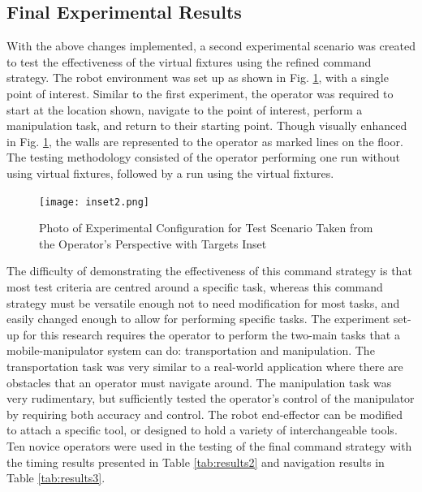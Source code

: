 \documentclass[onecolumn,10pt,final]{asme2ej}
\begin{document}
\subsection{Final Experimental Results}

With the above changes implemented, a second experimental scenario was created to test the effectiveness of the virtual fixtures using the refined command strategy. The robot environment was set up as shown in Fig. \ref{fig:setup}, with a single point of interest. Similar to the first experiment, the operator was required to start at the location shown, navigate to the point of interest, perform a manipulation task, and return to their starting point. Though visually enhanced in Fig. \ref{fig:setup}, the walls are represented to the operator as marked lines on the floor. The testing methodology consisted of the operator performing one run without using virtual fixtures, followed by a run using the virtual fixtures.\\

\begin{figure}[htbp!]
    \centering
    \texttt{[image: inset2.png]}
    \caption{Photo of Experimental Configuration for Test Scenario Taken from the Operator's Perspective with Targets Inset}
    \label{fig:setup}
\end{figure} 

The difficulty of demonstrating the effectiveness of this command strategy is that most test criteria are centred around a specific task, whereas this command strategy must be versatile enough not to need modification for most tasks, and easily changed enough to allow for performing specific tasks. The experiment set-up for this research requires the operator to perform the two-main tasks that a mobile-manipulator system can do: transportation and manipulation. The transportation task was very similar to a real-world application where there are obstacles that an operator must navigate around. The manipulation task was very rudimentary, but sufficiently tested the operator's control of the manipulator by requiring both accuracy and control. The robot end-effector can be modified to attach a specific tool, or designed to hold a variety of interchangeable tools. Ten novice operators were used in the testing of the final command strategy with the timing results presented in Table \ref{tab:results2} and navigation results in Table \ref{tab:results3}.\\
\end{document}
